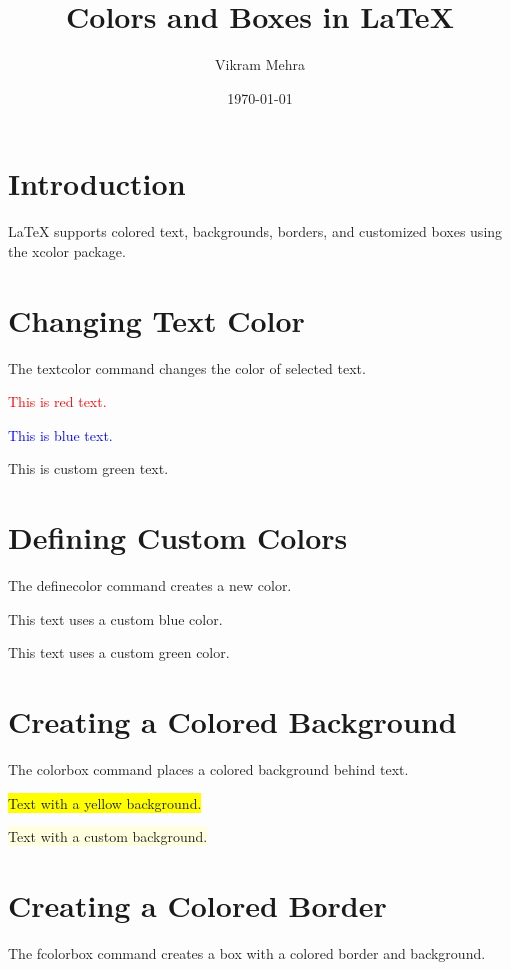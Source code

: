 \documentclass[12pt,a4paper]{article}
\title{Colors and Boxes in LaTeX}
\author{Vikram Mehra}
\date{\today}
\begin{document}
\maketitle

\section{Introduction}

LaTeX supports colored text, backgrounds, borders,
and customized boxes using the xcolor package.

\section{Changing Text Color}

The textcolor command changes the color of selected text.

\textcolor{red}{This is red text.}

\textcolor{blue}{This is blue text.}

\textcolor{mygreen}{This is custom green text.}

\section{Defining Custom Colors}

The definecolor command creates a new color.

\textcolor{myblue}{This text uses a custom blue color.}

\textcolor{mygreen}{This text uses a custom green color.}

\section{Creating a Colored Background}

The colorbox command places a colored background
behind text.

\colorbox{yellow}{Text with a yellow background.}

\bigskip

\colorbox{lightyellow}{Text with a custom background.}

\section{Creating a Colored Border}

The fcolorbox command creates a box with a colored
border and background.

\bigskip
\end{document}
